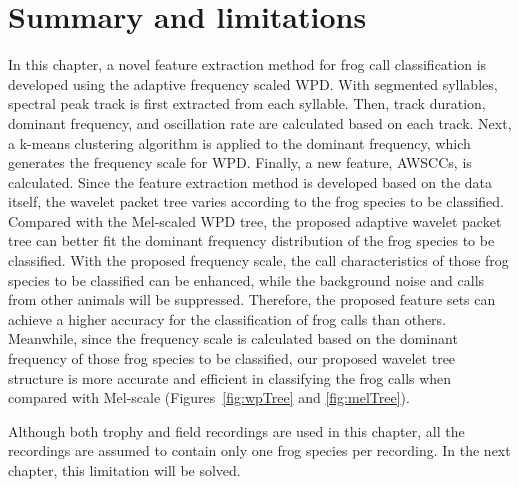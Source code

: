 \section{Summary and limitations}
In this chapter, a novel feature extraction method for frog call classification is developed using the adaptive frequency scaled WPD. With segmented syllables, spectral peak track is first extracted from each syllable. Then, track duration, dominant frequency, and oscillation rate are calculated based on each track. Next, a k-means clustering algorithm is applied to the dominant frequency, which generates the frequency scale for WPD. Finally, a new feature, AWSCCs, is calculated. Since the feature extraction method is developed based on the data itself, the wavelet packet tree varies according to the frog species to be classified. Compared with the Mel-scaled WPD tree, the proposed adaptive wavelet packet tree can better fit the dominant frequency distribution of the frog species to be classified. With the proposed frequency scale, the call characteristics of those frog species to be classified can be enhanced, while the background noise and calls from other animals will be suppressed. Therefore, the proposed feature sets can achieve a higher accuracy for the classification of frog calls than others. Meanwhile, since the frequency scale is calculated based on the dominant frequency of those frog species to be classified, our proposed wavelet tree structure is more accurate and efficient in classifying the frog calls when compared with Mel-scale (Figures~\ref{fig:wpTree} and \ref{fig:melTree}).


Although both trophy and field recordings are used in this chapter, all the recordings are assumed to contain only one frog species per recording. In the next chapter, this limitation will be solved.


